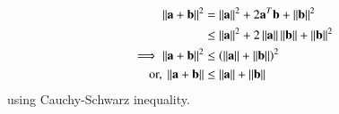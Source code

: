 	\begin{align}
		\norm{\vec{a}+\vec{b}}^2 &= \norm{\vec{a}}^2+2\vec{a}^T\vec{b}+\norm{\vec{b}}^2\\
&\le \norm{\vec{a}}^2+2\norm{\vec{a}}\norm{\vec{b}}+\norm{\vec{b}}^2\\
\implies 	\norm{\vec{a}+\vec{b}}^2 &\leq \brak{\norm{\vec{a}} + \norm{\vec{b}}}^2\\
\text{or, }		\norm{\vec{a}+\vec{b}} &\le  \norm{\vec{a}} + \norm{\vec{b}}
	\end{align}
using Cauchy-Schwarz inequality.
